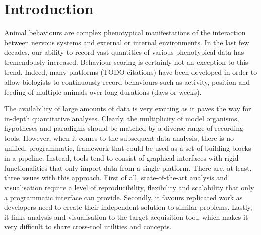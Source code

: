 \documentclass[10pt,letterpaper]{article}\usepackage[]{graphicx}\usepackage[]{color}
\begin{document}

\linenumbers

\section*{Introduction}

Animal behaviours are complex phenotypical manifestations of the interaction between nervous systems and external or internal environments.
In the last few decades, our ability to record vast quantities of various phenotypical data has tremendously increased.
Behaviour scoring is certainly not an exception to this trend.
Indeed, many platforms (TODO citations) have been developed in order to allow biologists to continuously record behaviours such as activity, position and feeding of multiple animals over long durations (days or weeks).

The availability of large amounts of data is very exciting as it paves the way for in-depth quantitative analyses.
Clearly, the multiplicity of model organisms, hypotheses and paradigms should be matched by a diverse range of recording tools.
However, when it comes to the subsequent data analysis, there is no unified, programmatic, framework that could be used as a set of building blocks in a pipeline.
Instead, tools tend to consist of graphical interfaces with rigid functionalities that only import data from a single platform.
There are, at least, three issues with this approach.
First of all, state-of-the-art analysis and visualisation require a level of reproducibility, flexibility and scalability that only a programmatic interface can provide.
Secondly, it favours replicated work as developers need to create their independent solution to similar problems.
Lastly, it links analysis and visualisation to the target acquisition tool, which makes it very difficult to share cross-tool utilities and concepts.
\end{document}
